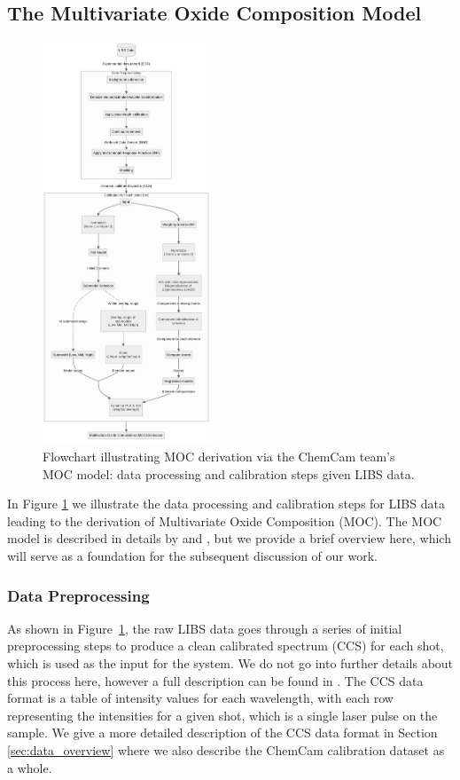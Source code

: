 \subsection{The Multivariate Oxide Composition Model}\label{sec:moc}
\begin{figure}[ht]
    \centering
    \includegraphics[width=0.45\textwidth]{images/pipeline.png}
    \caption{Flowchart illustrating MOC derivation via the ChemCam team's MOC model: data processing and calibration steps given LIBS data.}
    \label{fig:libs_data_processing}
\end{figure}

In Figure \ref{fig:libs_data_processing} we illustrate the data processing and calibration steps for LIBS data leading to the derivation of Multivariate Oxide Composition (MOC). The MOC model is described in details by \citet{cleggRecalibrationMarsScience2017} and \citet{andersonImprovedAccuracyQuantitative2017}, but we provide a brief overview here, which will serve as a foundation for the subsequent discussion of our work.

\subsubsection{Data Preprocessing}\label{sec:data_preprocessing}
As shown in Figure~\ref{fig:libs_data_processing}, the raw LIBS data goes through a series of initial preprocessing steps to produce a clean calibrated spectrum (CCS) for each shot, which is used as the input for the system.
We do not go into further details about this process here, however a full description can be found in \citet{wiensPreFlight3}.
The CCS data format is a table of intensity values for each wavelength, with each row representing the intensities for a given shot, which is a single laser pulse on the sample.
We give a more detailed description of the CCS data format in Section \ref{sec:data_overview} where we also describe the ChemCam calibration dataset as a whole.

